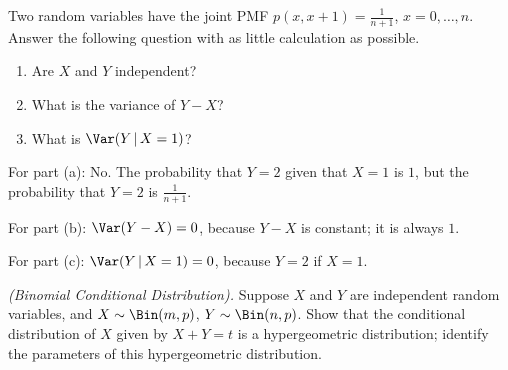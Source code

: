\begin{problem}[Handout 15, \# 13]
  Two random variables have the joint PMF \(p(x,x+1)=\frac{1}{n+1}\),
  \(x=0,\dotsc,n\). Answer the following question with as little
  calculation as possible.
  \begin{enumerate}[label=(\alph*),noitemsep]
  \item Are \(X\) and \(Y\) independent?
  \item What is the variance of \(Y-X\)?
  \item What is \(\Var(Y\,|\,{X=1})\)?
  \end{enumerate}
\end{problem}
\begin{solution}
  For part (a): No. The probability that $Y=2$ given that $X=1$ is $1$, but
  the probability that $Y=2$ is $\frac{1}{n+1}$.

  For part (b): $\Var(Y-X) = 0$, because $Y-X$ is constant; it is
  always $1$.

  For part (c): $\Var(Y\,|\,X=1) = 0$, because $Y = 2$ if $X=1$.
\end{solution}
\newpage

\begin{problem}[Handout 15, \# 14]
  \emph{(Binomial Conditional Distribution).} Suppose \(X\) and \(Y\) are
  independent random variables, and \(X\sim\Bin(m,p)\),
  \(Y\sim\Bin(n,p)\). Show that the conditional distribution of \(X\) given
  by \(X+Y=t\) is a hypergeometric distribution; identify the parameters of
  this hypergeometric distribution.
\end{problem}
\begin{solution}

\end{solution}
\newpage

